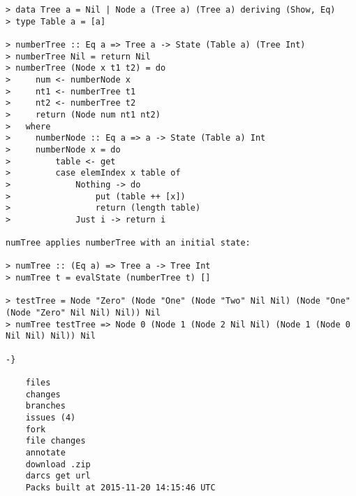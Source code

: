 \begin{lstlisting}
> data Tree a = Nil | Node a (Tree a) (Tree a) deriving (Show, Eq)
> type Table a = [a]

> numberTree :: Eq a => Tree a -> State (Table a) (Tree Int)
> numberTree Nil = return Nil
> numberTree (Node x t1 t2) = do
>     num <- numberNode x
>     nt1 <- numberTree t1
>     nt2 <- numberTree t2
>     return (Node num nt1 nt2)
>   where
>     numberNode :: Eq a => a -> State (Table a) Int
>     numberNode x = do
>         table <- get
>         case elemIndex x table of
>             Nothing -> do
>                 put (table ++ [x])
>                 return (length table)
>             Just i -> return i

numTree applies numberTree with an initial state:

> numTree :: (Eq a) => Tree a -> Tree Int
> numTree t = evalState (numberTree t) []

> testTree = Node "Zero" (Node "One" (Node "Two" Nil Nil) (Node "One" (Node "Zero" Nil Nil) Nil)) Nil
> numTree testTree => Node 0 (Node 1 (Node 2 Nil Nil) (Node 1 (Node 0 Nil Nil) Nil)) Nil

-}

    files
    changes
    branches
    issues (4)
    fork
    file changes
    annotate
    download .zip
    darcs get url
    Packs built at 2015-11-20 14:15:46 UTC
\end{lstlisting}
\newpage
